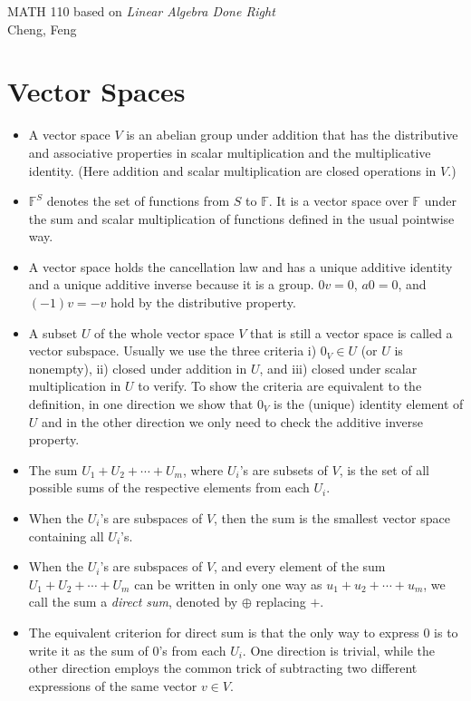 \documentclass{article}
\newcommand{\F}{\mathbb{F}}
\begin{document}
\begin{center}
    {\Large MATH 110 based on \textit{Linear Algebra Done Right}} \vspace{0.5em}
    \\ Cheng, Feng
    \vspace{-0.5em}
\end{center}

\section{Vector Spaces}
\begin{itemize}
    \item A vector space $V$ is an abelian group under addition that has the distributive and associative properties in scalar multiplication and the multiplicative identity. (Here addition and scalar multiplication are closed operations in $V$.)
    \item $\F^S$ denotes the set of functions from $S$ to $\F$. It is a vector space over $\F$ under the sum and scalar multiplication of functions defined in the usual pointwise way.
    \item A vector space holds the cancellation law and has a unique additive identity and a unique additive inverse because it is a group. $0v = 0$, $a0 = 0$, and $(-1)v = -v$ hold by the distributive property.
    \item A subset $U$ of the whole vector space $V$ that is still a vector space is called a vector subspace. Usually we use the three criteria i) $0_V \in U$ (or $U$ is nonempty), ii) closed under addition in $U$, and iii) closed under scalar multiplication in $U$ to verify. To show the criteria are equivalent to the definition, in one direction we show that $0_V$ is the (unique) identity element of $U$ and in the other direction we only need to check the additive inverse property.
    \item The sum $U_1 + U_2 +\cdots+ U_m$, where $U_i$'s are subsets of $V$, is the set of all possible sums of the respective elements from each $U_i$.
    \item When the $U_i$'s are subspaces of $V$, then the sum is the smallest vector space containing all $U_i$'s.
    \item When the $U_i$'s are subspaces of $V$, and every element of the sum $U_1 + U_2 +\cdots+ U_m$ can be written in only one way as $u_1+u_2+\cdots+u_m$, we call the sum a \textit{direct sum}, denoted by $\oplus$ replacing $+$.
    \item The equivalent criterion for direct sum is that the only way to express $0$ is to write it as the sum of $0$'s from each $U_i$. One direction is trivial, while the other direction employs the common trick of subtracting two different expressions of the same vector $v \in V$.

\end{itemize}
\end{document}
